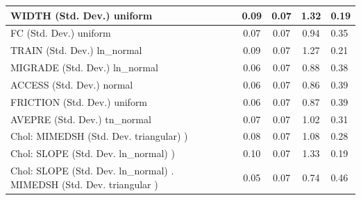 \begin{table}
\begin{center}
\begin{tabular}{|l|l|c|c|c|l|}
			WIDTH (Std. Dev.) uniform &  & 0.09 & 0.07 & 1.32 & 0.19 \\
			\hline
			FC (Std. Dev.) uniform &  & 0.07 & 0.07 & 0.94 & 0.35 \\
			\hline
			TRAIN (Std. Dev.) ln_normal &  & 0.09 & 0.07 & 1.27 & 0.21 \\
			\hline
			MIGRADE (Std. Dev.) ln_normal &  & 0.06 & 0.07 & 0.88 & 0.38 \\
			\hline
			ACCESS (Std. Dev.) normal &  & 0.06 & 0.07 & 0.86 & 0.39 \\
			\hline
			FRICTION (Std. Dev.) uniform &  & 0.06 & 0.07 & 0.87 & 0.39 \\
			\hline
			AVEPRE (Std. Dev.) tn_normal &  & 0.07 & 0.07 & 1.02 & 0.31 \\
			\hline
			 Chol: MIMEDSH (Std. Dev. triangular) ) &  & 0.08 & 0.07 & 1.08 & 0.28 \\
			\hline
			 Chol: SLOPE (Std. Dev. ln_normal) ) &  & 0.10 & 0.07 & 1.33 & 0.19 \\
			\hline
			 Chol: SLOPE (Std. Dev. ln_normal) . MIMEDSH (Std. Dev.   triangular ) &  & 0.05 & 0.07 & 0.74 & 0.46 \\
			\hline
		\end{tabular}
	\end{center}
\end{table}